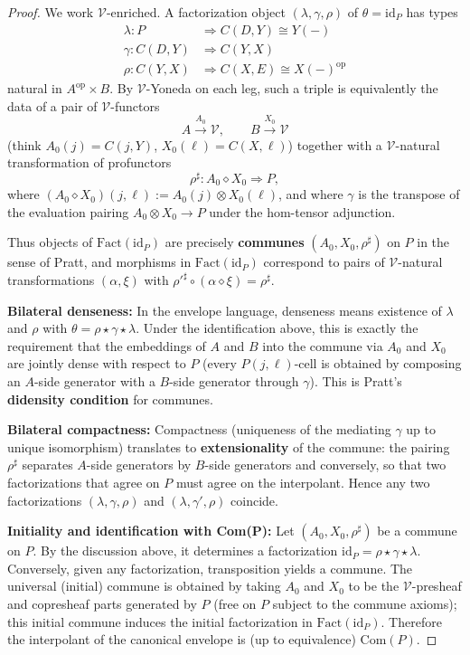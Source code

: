 \documentclass[11pt]{article}
\theoremstyle{plain}
\theoremstyle{definition}
\theoremstyle{remark}
\newcommand{\V}{\mathcal{V}}
\newcommand{\op}{\mathrm{op}}
\newcommand{\Fact}{\mathrm{Fact}}
\begin{document}
\begin{proof}
We work $\V$-enriched. A factorization object $(\lambda, \gamma, \rho)$ of $\theta = \mathrm{id}_P$ has types
\begin{align}
\lambda : P &\Rightarrow C(D, Y) \cong Y(-) \\
\gamma : C(D, Y) &\Rightarrow C(Y, X) \\  
\rho : C(Y, X) &\Rightarrow C(X, E) \cong X(-)^{\op}
\end{align}
natural in $A^{\op} \times B$. By $\V$-Yoneda on each leg, such a triple is equivalently the data of a pair of $\V$-functors
$$
A \xrightarrow{A_0} \V, \qquad B \xrightarrow{X_0} \V
$$
(think $A_0(j) = C(j, Y)$, $X_0(\ell) = C(X, \ell)$) together with a $\V$-natural transformation of profunctors
$$
\rho^{\sharp} : A_0 \diamond X_0 \Rightarrow P,
$$
where $(A_0 \diamond X_0)(j, \ell) := A_0(j) \otimes X_0(\ell)$, and where $\gamma$ is the transpose of the evaluation pairing $A_0 \otimes X_0 \to P$ under the hom-tensor adjunction. 

Thus objects of $\Fact(\mathrm{id}_P)$ are precisely \textbf{communes} $(A_0, X_0, \rho^{\sharp})$ on $P$ in the sense of Pratt, and morphisms in $\Fact(\mathrm{id}_P)$ correspond to pairs of $\V$-natural transformations $(\alpha, \xi)$ with $\rho'^{\sharp} \circ (\alpha \diamond \xi) = \rho^{\sharp}$.

\textbf{Bilateral denseness:} In the envelope language, denseness means existence of $\lambda$ and $\rho$ with $\theta = \rho \star \gamma \star \lambda$. Under the identification above, this is exactly the requirement that the embeddings of $A$ and $B$ into the commune via $A_0$ and $X_0$ are jointly dense with respect to $P$ (every $P(j, \ell)$-cell is obtained by composing an $A$-side generator with a $B$-side generator through $\gamma$). This is Pratt's \textbf{didensity condition} for communes.

\textbf{Bilateral compactness:} Compactness (uniqueness of the mediating $\gamma$ up to unique isomorphism) translates to \textbf{extensionality} of the commune: the pairing $\rho^{\sharp}$ separates $A$-side generators by $B$-side generators and conversely, so that two factorizations that agree on $P$ must agree on the interpolant. Hence any two factorizations $(\lambda, \gamma, \rho)$ and $(\lambda, \gamma', \rho)$ coincide.

\textbf{Initiality and identification with Com(P):} Let $(A_0, X_0, \rho^{\sharp})$ be a commune on $P$. By the discussion above, it determines a factorization $\mathrm{id}_P = \rho \star \gamma \star \lambda$. Conversely, given any factorization, transposition yields a commune. The universal (initial) commune is obtained by taking $A_0$ and $X_0$ to be the $\V$-presheaf and copresheaf parts generated by $P$ (free on $P$ subject to the commune axioms); this initial commune induces the initial factorization in $\Fact(\mathrm{id}_P)$. Therefore the interpolant of the canonical envelope is (up to equivalence) $\mathrm{Com}(P)$.
\end{proof}
\end{document}
